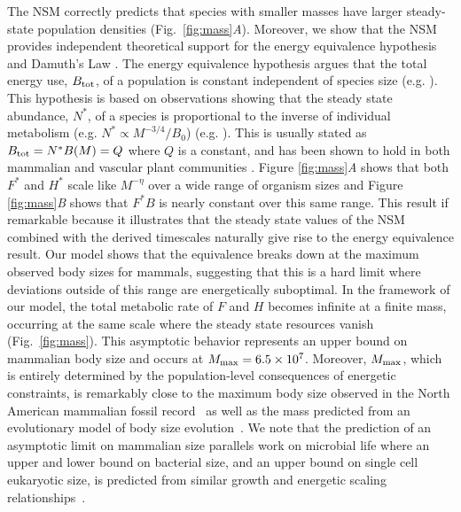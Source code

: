 \documentclass{pnastwo}
\begin{document}
\begin{article}
The NSM correctly predicts that species with smaller masses have larger steady-state population densities (Fig.~\ref{fig:mass}\emph{A}).
Moreover, we show that the NSM provides independent theoretical support for the energy equivalence hypothesis and Damuth's Law \cite{damuth1987interspecific,allen2002,enquist1998}.
The energy equivalence hypothesis argues that the total energy use, $B_{\rm tot}$, of a population is constant independent of species size (e.g. \cite{damuth1987interspecific,allen2002,enquist1998}). %
This hypothesis is based on observations showing that the steady state abundance, $N^*$, of a species is proportional to the inverse of individual metabolism (e.g. $N^*\propto M^{-3/4}/B_{0}$)  (e.g. \cite{allen2002,enquist1998}).
This is usually stated as $B_{\rm tot}=N^*B(M)=Q$ where $Q$ is a constant, and has been shown to hold in both mammalian and vascular plant communities \cite{damuth1987interspecific,allen2002,enquist1998}.
Figure \ref{fig:mass}\emph{A} shows that both $F^{*}$ and $H^{*}$ scale like $M^{-\eta}$ over a wide range of organism sizes and Figure \ref{fig:mass}\emph{B} shows that $F^{*}B$ is nearly constant over this same range.
This result if remarkable because it illustrates that the steady state values of the NSM combined with the derived timescales naturally give rise to the energy equivalence result.
Our model shows that the equivalence breaks down at the maximum observed body sizes for mammals, suggesting that this is a hard limit where deviations outside of this range are energetically suboptimal. %
In the framework of our model, the total metabolic rate of $F$ and $H$ becomes infinite at a finite mass, occurring at the same scale where the steady state resources vanish (Fig.~\ref{fig:mass}). This asymptotic behavior represents an upper bound on mammalian body size and occurs at $M_{\rm max}=6.5\times10^7$.
Moreover, $M_{\rm max}$, which is entirely determined by the population-level consequences of energetic constraints, is remarkably close to the maximum body size observed in the North American mammalian fossil record~\cite{Alroy:1998p1594} as well as the mass predicted from an evolutionary model of body size evolution~\cite{Clauset:2009fh}.
We note that the prediction of an asymptotic limit on mammalian size parallels work on microbial life where an upper and lower bound on bacterial size, and an upper bound on single cell eukaryotic size, is predicted from similar growth and energetic scaling relationships~\cite{Kempes:2012hy,Kempes:2016}. %



\end{article}
\end{document}
